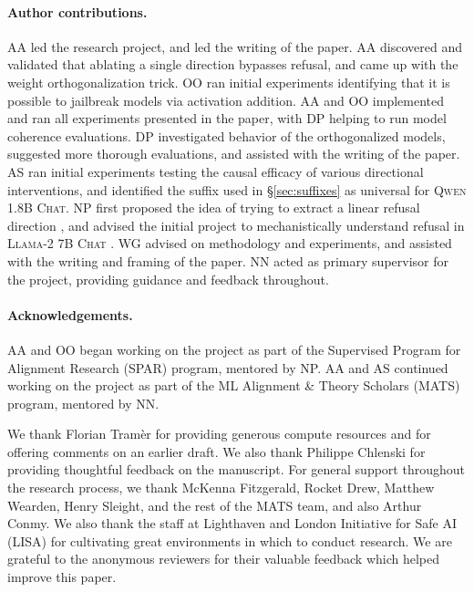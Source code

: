 \documentclass{article}
\begin{document}
\begin{ack}

\paragraph{Author contributions.}
AA led the research project, and led the writing of the paper.
AA discovered and validated that ablating a single direction bypasses refusal, and came up with the weight orthogonalization trick.
OO ran initial experiments identifying that it is possible to jailbreak models via activation addition.
AA and OO implemented and ran all experiments presented in the paper, with DP helping to run model coherence evaluations.
DP investigated behavior of the orthogonalized models, suggested more thorough evaluations, and assisted with the writing of the paper.
AS ran initial experiments testing the causal efficacy of various directional interventions, and identified the suffix used in \S\ref{sec:suffixes} as universal for \textsc{Qwen 1.8B Chat}.
NP first proposed the idea of trying to extract a linear refusal direction \citep{panickssery2023redteaming}, and advised the initial project to mechanistically understand refusal in \textsc{Llama-2 7B Chat} \citep{arditi2023refusal}.
WG advised on methodology and experiments, and assisted with the writing and framing of the paper.
NN acted as primary supervisor for the project, providing guidance and feedback throughout.

\paragraph{Acknowledgements.}
AA and OO began working on the project as part of the Supervised Program for Alignment Research (SPAR) program, mentored by NP.
AA and AS continued working on the project as part of the ML Alignment \& Theory Scholars (MATS) program, mentored by NN.

We thank Florian Tramèr for providing generous compute resources and for offering comments on an earlier draft.
We also thank Philippe Chlenski for providing thoughtful feedback on the manuscript.
For general support throughout the research process, we thank McKenna Fitzgerald, Rocket Drew, Matthew Wearden, Henry Sleight, and the rest of the MATS team, and also Arthur Conmy.
We also thank the staff at Lighthaven and London Initiative for Safe AI (LISA) for cultivating great environments in which to conduct research.
We are grateful to the anonymous reviewers for their valuable feedback which helped improve this paper.


\end{ack}
\end{document}
